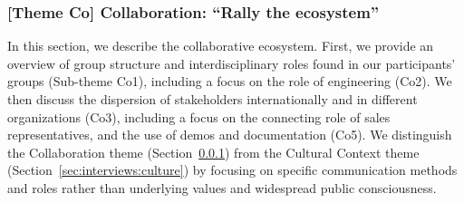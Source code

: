\subsubsection{\textbf{[Theme Co]} Collaboration: ``Rally the ecosystem''}
\label{sec:interviews:collaboration}
\noindent
In this section, we describe the collaborative ecosystem.
First, we provide an overview of group structure and interdisciplinary roles found in our participants' groups (Sub-theme Co1), including a focus on the role of engineering (Co2).
We then discuss the dispersion of stakeholders internationally and in different organizations (Co3), including a focus on the connecting role of sales representatives, %
and the use of demos and documentation (Co5).
We distinguish the Collaboration theme (Section~\ref{sec:interviews:collaboration}) from the Cultural Context theme (Section~\ref{sec:interviews:culture}) by focusing on specific communication methods and roles rather than underlying values and widespread public consciousness.

